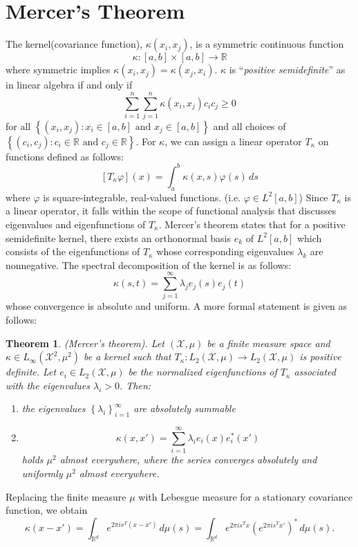 \documentclass[11pt]{article}
\newtheorem{thm}{Theorem}[section]
\newcommand{\RR}{\mathbb{R}} %
\begin{document}
\section{Mercer's Theorem}
The kernel(covariance function), $\kappa \left(x_{i}, x_{j}\right)$, is a symmetric continuous function
$$
  \kappa: [a, b] \times [a,b] \rightarrow \mathbb{R}
$$
where symmetric implies $\kappa \left(x_{i}, x_{j}\right) = \kappa \left(x_{j}, x_{i}\right)$. $\kappa$ is ``\emph{positive semidefinite}'' as in linear algebra if and only if
$$
  \sum_{i=1}^{n}\sum_{j=1}^{n} \kappa \left(x_{i}, x_{j}\right)c_{i}c_{j} \ge 0
$$
for all $\left\{\left(x_{i}, x_{j}\right): x_{i} \in [a,b] \text{ and } x_{j} \in [a,b] \right\}$ and all choices of $\left\{\left(c_{i}, c_{j}\right): c_{i}\in \mathbb{R} \text{ and } c_{j}\in \mathbb{R} \right\}$. For $\kappa$, we can assign a linear operator $T_{\kappa}$ on functions defined as follows:
$$
  \left[T_{\kappa}\varphi \right]\left(x\right) = \int_{a}^{b} \kappa \left(x, s\right) \varphi\left(s\right) \, ds
$$
where $\varphi$ is square-integrable, real-valued functions. (i.e. $\varphi \in L^{2}[a,b]$) Since $T_{\kappa}$ is a linear operator, it falls within the scope of functional analysis that discusses eigenvalues and eigenfunctions of $T_{\kappa}$. Mercer's theorem states that for a positive semidefinite kernel, there exists an orthonormal basis $e_{k}$ of $L^{2}[a,b]$ which consists of the eigenfunctions of $T_{\kappa}$ whose corresponding eigenvalues $\lambda_{k}$ are nonnegative. The spectral decomposition of the kernel is as follows:
$$
  \kappa \left(s, t\right) = \sum_{j=1}^{\infty}\lambda_{j} e_{j}\left(s\right)e_{j}\left(t\right)
$$
whose convergence is absolute and uniform. A more formal statement is given as follows:
\begin{thm}{(Mercer's theorem)}. Let $\left(\mathcal{X},\mu\right)$ be a finite measure space and $\kappa \in L_{\infty} \left(\mathcal{X}^{2}, \mu^{2}\right)$ be a kernel such that $T_{\kappa}:L_{2}\left(\mathcal{X}, \mu\right) \rightarrow L_{2}\left(\mathcal{X},\mu \right)$ is positive definite. Let $e_{i} \in L_{2}\left(\mathcal{X},\mu \right)$ be the normalized eigenfunctions of $T_{\kappa}$ associated with the eigenvalues $\lambda_{i} > 0$. Then:
\begin{enumerate}
  \item the eigenvalues $\left\{\lambda_{i} \right\}_{i=1}^{\infty}$ are absolutely summable
  \item $$
  \kappa \left(x, x'\right) = \sum_{i=1}^{\infty} \lambda_{i}e_{i}\left(x\right)e_{i}^{*}\left(x'\right)
  $$
  holds $\mu^{2}$ almost everywhere, where the series converges absolutely and uniformly $\mu^{2}$ almost everywhere.
\end{enumerate}
\end{thm}
Replacing the finite measure $\mu$ with Lebesgue measure for a stationary covariance function, we obtain
$$
  \kappa \left(x-x'\right) = \int_{\RR^{d}} e^{2\pi i s^{T} \left(x-x'\right)} \, d\mu \left(s\right) = \int_{\RR^{d}} e^{2\pi i s^{T} x}\left(e^{2\pi i s^{T} x'}\right)^{*}\, d\mu\left(s\right).
$$
\end{document}
